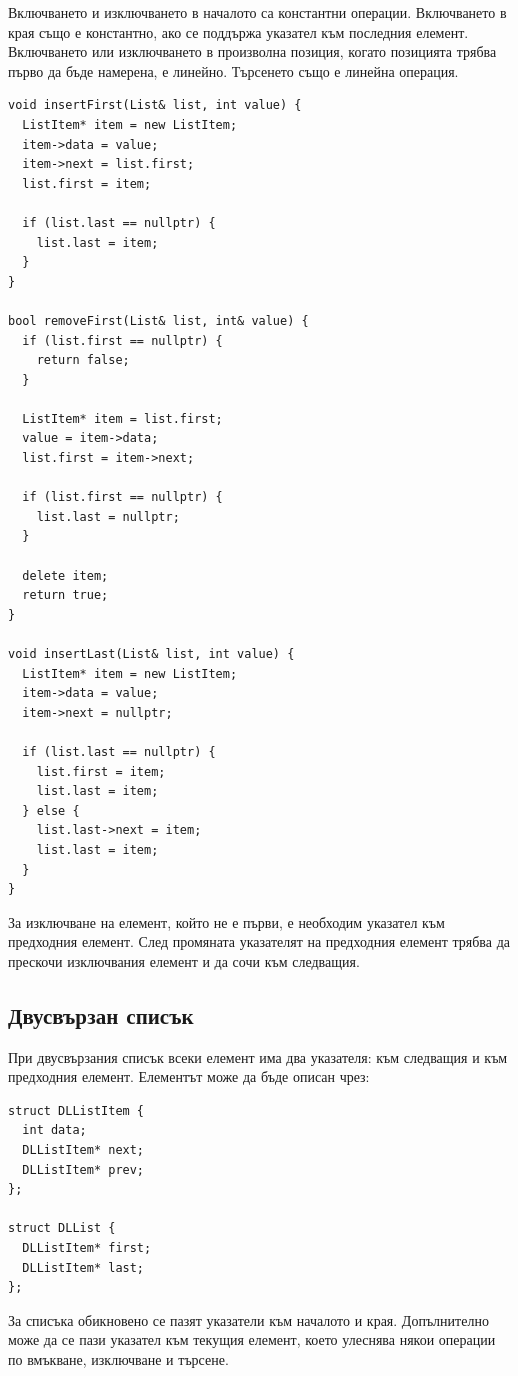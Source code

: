Включването и изключването в началото са константни операции. Включването в края също е константно, ако се поддържа указател към последния елемент. Включването или изключването в произволна позиция, когато позицията трябва първо да бъде намерена, е линейно. Търсенето също е линейна операция.

\begin{verbatim}
void insertFirst(List& list, int value) {
  ListItem* item = new ListItem;
  item->data = value;
  item->next = list.first;
  list.first = item;

  if (list.last == nullptr) {
    list.last = item;
  }
}

bool removeFirst(List& list, int& value) {
  if (list.first == nullptr) {
    return false;
  }

  ListItem* item = list.first;
  value = item->data;
  list.first = item->next;

  if (list.first == nullptr) {
    list.last = nullptr;
  }

  delete item;
  return true;
}

void insertLast(List& list, int value) {
  ListItem* item = new ListItem;
  item->data = value;
  item->next = nullptr;

  if (list.last == nullptr) {
    list.first = item;
    list.last = item;
  } else {
    list.last->next = item;
    list.last = item;
  }
}
\end{verbatim}

За изключване на елемент, който не е първи, е необходим указател към предходния елемент. След промяната указателят на предходния елемент трябва да прескочи изключвания елемент и да сочи към следващия.

\subsection{Двусвързан списък}\label{s:18.5.2}

При двусвързания списък всеки елемент има два указателя: към следващия и към предходния елемент. Елементът може да бъде описан чрез:

\begin{verbatim}
struct DLListItem {
  int data;
  DLListItem* next;
  DLListItem* prev;
};

struct DLList {
  DLListItem* first;
  DLListItem* last;
};
\end{verbatim}

За списъка обикновено се пазят указатели към началото и края. Допълнително може да се пази указател към текущия елемент, което улеснява някои операции по вмъкване, изключване и търсене.

